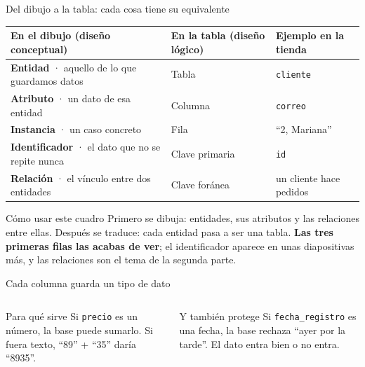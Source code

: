 \documentclass[aspectratio=169,10pt,c]{beamer}
\begin{document}
\begin{frame}{Del dibujo a la tabla: cada cosa tiene su equivalente}
\begin{center}
\footnotesize
\begin{tabular}{>{\raggedright\arraybackslash}p{4.9cm}>{\raggedright\arraybackslash}p{2.9cm}>{\raggedright\arraybackslash}p{3.9cm}}
\toprule
\bfseries En el dibujo (diseño conceptual) & \bfseries En la tabla (diseño lógico) & \bfseries Ejemplo en la tienda \\
\midrule
\textbf{Entidad} · aquello de lo que guardamos datos & Tabla & \texttt{cliente} \\
\textbf{Atributo} · un dato de esa entidad & Columna & \texttt{correo} \\
\textbf{Instancia} · un caso concreto & Fila & ``2, Mariana'' \\
\textbf{Identificador} · el dato que no se repite nunca & Clave primaria & \texttt{id} \\
\textbf{Relación} · el vínculo entre dos entidades & Clave foránea & un cliente hace pedidos \\
\bottomrule
\end{tabular}
\end{center}
\vspace{0.3cm}
\begin{block}{Cómo usar este cuadro}
\small Primero se dibuja: entidades, sus atributos y las relaciones entre ellas. Después se traduce: cada entidad pasa a ser una tabla. \textbf{Las tres primeras filas las acabas de ver}; el identificador aparece en unas diapositivas más, y las relaciones son el tema de la segunda parte.
\end{block}
\end{frame}

\begin{frame}{Cada columna guarda un tipo de dato}
\vspace{0.35cm}
\begin{columns}[T,onlytextwidth]
\begin{exampleblock}{Para qué sirve}
\small Si \texttt{precio} es un número, la base puede sumarlo. Si fuera texto, ``89'' + ``35'' daría ``8935''.
\end{exampleblock}
\begin{alertblock}{Y también protege}
\small Si \texttt{fecha\_registro} es una fecha, la base rechaza ``ayer por la tarde''. El dato entra bien o no entra.
\end{alertblock}
\end{columns}
\end{frame}
\end{document}
